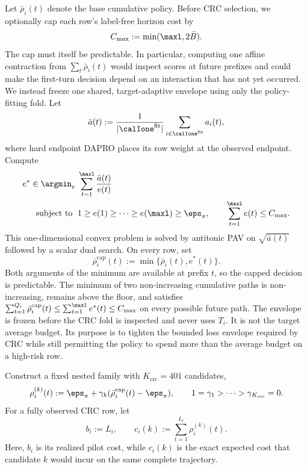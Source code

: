 Let $\bar\rho_i(t)$ denote the base cumulative policy.  Before CRC selection,
we optionally cap each row's label-free horizon cost by
\begin{equation}
    C_{\max}:=\min(\maxl,2\bar B).
\end{equation}
The cap must itself be predictable.  In particular, computing one affine
contraction from $\sum_t\bar\rho_i(t)$ would inspect scores at future prefixes
and could make the first-turn decision depend on an interaction that has not
yet occurred.  We instead freeze one shared, target-adaptive envelope using
only the policy-fitting fold.  Let
\begin{equation}
    \bar a(t):=\frac{1}{|\calIone^{\mathrm{fit}}|}
    \sum_{i\in\calIone^{\mathrm{fit}}}a_i(t),
\end{equation}
where hard endpoint DAPRO places its row weight at the observed endpoint.
Compute
\begin{equation}
\begin{split}
    e^*\in\argmin_e\;&\sum_{t=1}^{\maxl}\frac{\bar a(t)}{e(t)}\\
    \text{subject to }\;&1\geq e(1)\geq\cdots\geq e(\maxl)
       \geq\eps_\pi,
       \qquad \sum_{t=1}^{\maxl}e(t)\leq C_{\max}.
\end{split}
\label{eq:dapro_causal_row_cap}
\end{equation}
This one-dimensional convex problem is solved by antitonic PAV on
$\sqrt{\bar a(t)}$ followed by a scalar dual search.  On every row, set
\begin{equation}
    \bar\rho_i^{\mathrm{cap}}(t)
    :=\min\{\bar\rho_i(t),e^*(t)\}.
\end{equation}
Both arguments of the minimum are available at prefix $t$, so the capped
decision is predictable.  The minimum of two non-increasing cumulative paths
is non-increasing, remains above the floor, and satisfies
$\sum_{t=1}^{Q_i}\bar\rho_i^{\mathrm{cap}}(t)
\leq\sum_{t=1}^{\maxl}e^*(t)\leq C_{\max}$ on every possible future path.
The envelope is frozen before the CRC fold is inspected and never uses $T_i$.
It is not the target average budget.  Its purpose is to tighten the bounded
loss envelope required by CRC while still permitting the policy to spend more
than the average budget on a high-risk row.

Construct a fixed nested family with $K_{\mathrm{crc}}=401$ candidates,
\begin{equation}
    \rho_i^{(k)}(t)
    :=\eps_\pi+\gamma_k
    (\bar\rho_i^{\mathrm{cap}}(t)-\eps_\pi),
    \qquad
    1=\gamma_1>\cdots>\gamma_{K_{\mathrm{crc}}}=0.
    \label{eq:dapro_crc_family}
\end{equation}
For a fully observed CRC row, let
\begin{equation}
    b_i:=L_i,
    \qquad
    c_i(k):=\sum_{t=1}^{L_i}\rho_i^{(k)}(t).
\end{equation}
Here, $b_i$ is its realized pilot cost, while $c_i(k)$ is the exact expected
cost that candidate $k$ would incur on the same complete trajectory.

